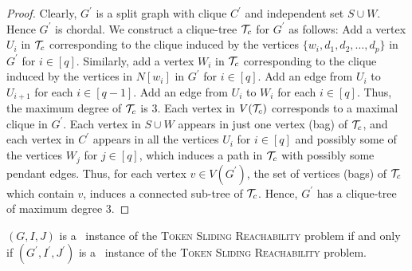 \begin{proof}
Clearly, $G^\prime$ is a split graph with clique $C^\prime$ 
and independent set $S\cup W$. 
Hence $G^\prime$ is chordal. 
We construct a clique-tree $\mathcal{T}_c$ for $G^\prime$ as follows: 
Add a vertex $U_i$ in $\mathcal{T}_c$ corresponding to the clique 
induced by the vertices $\{w_i,d_1,d_2,\ldots,d_p\}$ in $G^\prime$ 
for $i\in [q]$. 
Similarly, add a vertex $W_i$ in $\mathcal{T}_c$ corresponding 
to the clique induced by the vertices in $N[w_i]$ in $G^\prime$ for $i\in [q]$. 
Add an edge from $U_i$ to $U_{i+1}$ for each $i\in [q-1]$. 
Add an edge from $U_i$ to $W_i$ for each $i\in [q]$. 
Thus, the maximum degree of $\mathcal{T}_c$ is $3$. 
Each vertex in $V(\mathcal{T}_c)$ corresponds to a maximal clique in 
$G^\prime$. 
Each vertex in $S\cup W$ appears in just one vertex (bag) of $\mathcal{T}_c$,
and each vertex in $C^\prime$ appears in all the vertices $U_i$ for 
$i\in [q]$ and possibly some of the vertices $W_j$ for $j\in [q]$, 
which induces a path in $\mathcal{T}_c$ with possibly some pendant edges.
Thus, for each vertex $v\in V(G^\prime)$, the set of vertices (bags) of 
$\mathcal{T}_c$ which contain $v$, 
induces a connected sub-tree of $\mathcal{T}_c$. 
Hence, $G^\prime$ has a clique-tree of maximum degree $3$. 
\end{proof}
\begin{lemma}
$(G,I,J)$ is a \yes\ instance of the \textsc{Token Sliding Reachability} problem
if and only if $(G^\prime, I^\prime, J^\prime)$ is a \yes\ instance of the \textsc{Token Sliding Reachability} problem.
\end{lemma}
